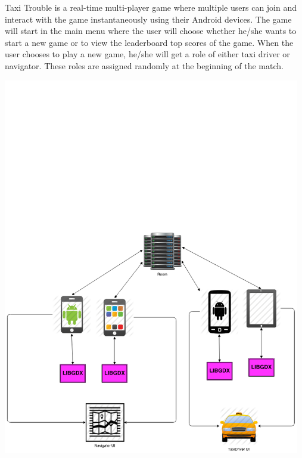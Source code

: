 
Taxi Trouble is a real-time multi-player game where multiple users can join and interact with the game instantaneously using their Android devices. The game will start in the main menu where the user will choose whether he/she wants to start a new game or to view the leaderboard top scores of the game. When the user chooses to play a new game, he/she will get a role of either taxi driver or navigator. These roles are assigned randomly at the beginning of the match.\\
\begin{center}
	 \includegraphics[width=130mm]{./images/Sprint2_softhard2.png}
\end{center}